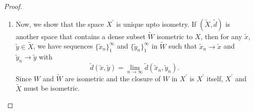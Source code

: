 \documentclass[12pt]{article}
\newcommand{\xprime}{X^\prime}
\begin{document}
\begin{enumerate}
\begin{mybox}
\begin{proof}
\begin{enumerate}
            \vspace*{3mm}
            \item Now, we show that the space $\xprime$ is
            unique upto isometry. If $(\tilde{X},\tilde{d})$
            is another space that contains a dense
            subset $\tilde{W}$ isometric to $X$, then
            for any $\tilde{x}$, $\tilde{y}\in
            \tilde{X}$, we have sequences $\{\tilde{x}_n\}
            _1^\infty$
            and $\{\tilde{y}_n\}
            _1^\infty$ in $\tilde{W}$ such that
            $\tilde{x}_n\to \tilde{x}$ and 
            $\tilde{y}_n\to \tilde{y}$ with
            $$\tilde{d}(\tilde{x},\tilde{y})=
            \lim_{n\to\infty}
            {\tilde{d}(\tilde{x}_n,\tilde{y}_n)}.$$
            Since $W$ and $\tilde{W}$ are isometric
            and the closure of $W$ in $\xprime$ is
            $\xprime$ itself, $\xprime$ and $\tilde{X}$
            must be isometric.
            

        \end{enumerate}
    \end{proof}

\end{mybox}
 
 
\end{enumerate}
\end{document}
